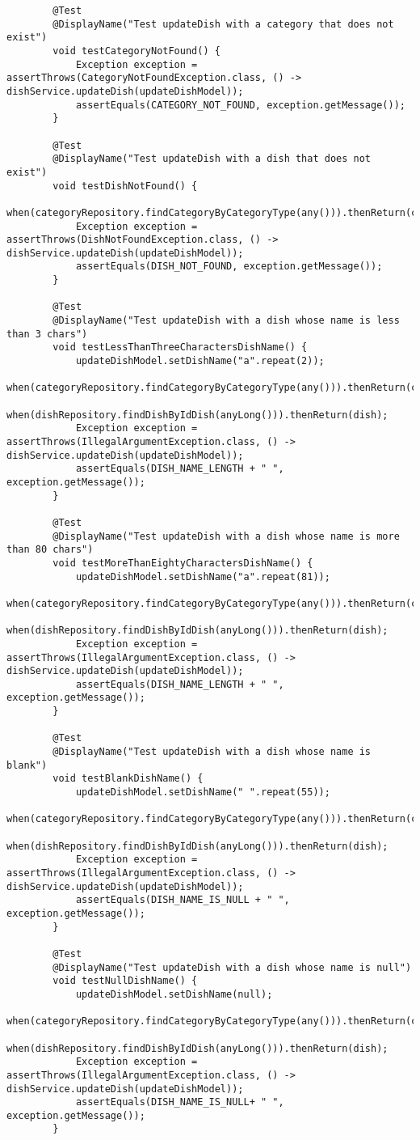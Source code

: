 \begin{verbatim}
		@Test
		@DisplayName("Test updateDish with a category that does not exist")
		void testCategoryNotFound() {
			Exception exception = assertThrows(CategoryNotFoundException.class, () -> dishService.updateDish(updateDishModel));
			assertEquals(CATEGORY_NOT_FOUND, exception.getMessage());
		}

		@Test
		@DisplayName("Test updateDish with a dish that does not exist")
		void testDishNotFound() {
			when(categoryRepository.findCategoryByCategoryType(any())).thenReturn(category);
			Exception exception = assertThrows(DishNotFoundException.class, () -> dishService.updateDish(updateDishModel));
			assertEquals(DISH_NOT_FOUND, exception.getMessage());
		}

		@Test
		@DisplayName("Test updateDish with a dish whose name is less than 3 chars")
		void testLessThanThreeCharactersDishName() {
			updateDishModel.setDishName("a".repeat(2));
			when(categoryRepository.findCategoryByCategoryType(any())).thenReturn(category);
			when(dishRepository.findDishByIdDish(anyLong())).thenReturn(dish);
			Exception exception = assertThrows(IllegalArgumentException.class, () -> dishService.updateDish(updateDishModel));
			assertEquals(DISH_NAME_LENGTH + " ", exception.getMessage());
		}

		@Test
		@DisplayName("Test updateDish with a dish whose name is more than 80 chars")
		void testMoreThanEightyCharactersDishName() {
			updateDishModel.setDishName("a".repeat(81));
			when(categoryRepository.findCategoryByCategoryType(any())).thenReturn(category);
			when(dishRepository.findDishByIdDish(anyLong())).thenReturn(dish);
			Exception exception = assertThrows(IllegalArgumentException.class, () -> dishService.updateDish(updateDishModel));
			assertEquals(DISH_NAME_LENGTH + " ", exception.getMessage());
		}

		@Test
		@DisplayName("Test updateDish with a dish whose name is blank")
		void testBlankDishName() {
			updateDishModel.setDishName(" ".repeat(55));
			when(categoryRepository.findCategoryByCategoryType(any())).thenReturn(category);
			when(dishRepository.findDishByIdDish(anyLong())).thenReturn(dish);
			Exception exception = assertThrows(IllegalArgumentException.class, () -> dishService.updateDish(updateDishModel));
			assertEquals(DISH_NAME_IS_NULL + " ", exception.getMessage());
		}

		@Test
		@DisplayName("Test updateDish with a dish whose name is null")
		void testNullDishName() {
			updateDishModel.setDishName(null);
			when(categoryRepository.findCategoryByCategoryType(any())).thenReturn(category);
			when(dishRepository.findDishByIdDish(anyLong())).thenReturn(dish);
			Exception exception = assertThrows(IllegalArgumentException.class, () -> dishService.updateDish(updateDishModel));
			assertEquals(DISH_NAME_IS_NULL+ " ", exception.getMessage());
		}


\end{verbatim}
